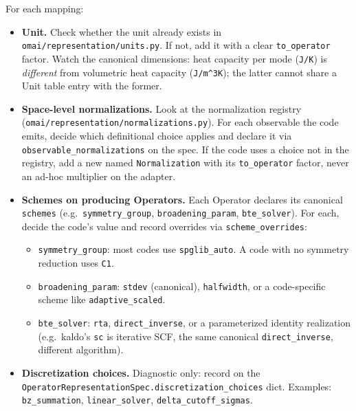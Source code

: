 \documentclass[11pt,a4paper]{article}
\begin{document}
For each mapping:
\begin{itemize}[leftmargin=2em]
  \item \textbf{Unit.} Check whether the unit already exists in
        \texttt{omai/representation/units.py}. If not, add it with a clear
        \texttt{to\_operator} factor. Watch the canonical dimensions: heat capacity
        per mode (\texttt{J/K}) is \emph{different} from volumetric heat capacity
        (\texttt{J/m\^{}3K}); the latter cannot share a Unit table entry with the
        former.
  \item \textbf{Space-level normalizations.} Look at the normalization registry
        (\texttt{omai/representation/normalizations.py}). For each observable the
        code emits, decide which definitional choice applies and declare it via
        \texttt{observable\_normalizations} on the spec. If the code uses a choice
        not in the registry, add a new named \texttt{Normalization} with its
        \texttt{to\_operator} factor, never an ad-hoc multiplier on the adapter.
  \item \textbf{Schemes on producing Operators.} Each Operator declares its
        canonical \texttt{schemes} (e.g.\ \texttt{symmetry\_group},
        \texttt{broadening\_param}, \texttt{bte\_solver}). For each, decide the
        code's value and record overrides via \texttt{scheme\_overrides}:
        \begin{itemize}[leftmargin=1.5em]
          \item \texttt{symmetry\_group}: most codes use \texttt{spglib\_auto}. A
                code with no symmetry reduction uses \texttt{C1}.
          \item \texttt{broadening\_param}: \texttt{stdev} (canonical),
                \texttt{halfwidth}, or a code-specific scheme like
                \texttt{adaptive\_scaled}.
          \item \texttt{bte\_solver}: \texttt{rta}, \texttt{direct\_inverse}, or a
                parameterized identity realization (e.g.\ kaldo's \texttt{sc} is
                iterative SCF, the same canonical \texttt{direct\_inverse},
                different algorithm).
        \end{itemize}
  \item \textbf{Discretization choices.} Diagnostic only: record on the
        \texttt{OperatorRepresentationSpec.discretization\_choices} dict. Examples:
        \texttt{bz\_summation}, \texttt{linear\_solver},
        \texttt{delta\_cutoff\_sigmas}.
\end{itemize}
\end{document}

